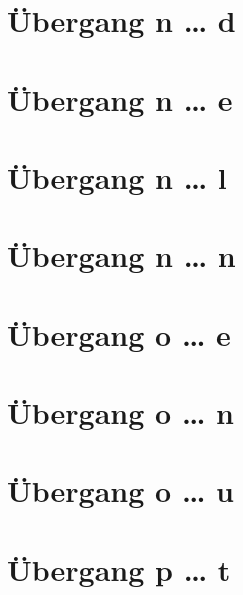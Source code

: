 \documentclass[a4paper,landscape]{article}
\begin{document}
\hspace*{-1ex}
\newpage

\section{Übergang n … d }

\hspace*{-1ex}
\newpage

\section{Übergang n … e }

\hspace*{-1ex}
\newpage

\section{Übergang n … l }

\hspace*{-1ex}
\newpage

\section{Übergang n … n }

\hspace*{-1ex}
\newpage

\section{Übergang o … e }

\hspace*{-1ex}
\newpage

\section{Übergang o … n }

\hspace*{-1ex}
\newpage

\section{Übergang o … u }

\hspace*{-1ex}
\newpage

\section{Übergang p … t }
\end{document}
